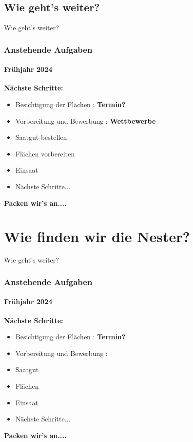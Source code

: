 \documentclass[aspectratio=169]{beamer}
\begin{document}
\subsection[Aufgaben]{Wie geht's weiter?}

\begin{frame}{Wie geht's weiter?}
	\frametitle{Anstehende Aufgaben} 
	\framesubtitle{Frühjahr 2024}

	\textbf{Nächste Schritte:}\\
	\begin{itemize}
		\item 
			Besichtigung der Flächen : 
			\textbf{Termin?} \pause 
		\item 
			Vorbereitung und Bewerbung : 
			\textbf{Wettbewerbe} \pause 
		\item 
			Saatgut bestellen \pause
		\item 
			Flächen vorbereiten \pause
		\item 
			Einsaat \pause
		\item 
			Nächste Schritte...%
	\end{itemize}
	\begin{center}
	\textbf{Packen wir's an....}	
	\end{center}
\end{frame}


\section[Aufgaben]{Wie finden wir die Nester?}

\begin{frame}{Wie geht's weiter?}
	\frametitle{Anstehende Aufgaben} 
	\framesubtitle{Frühjahr 2024}
	
	\textbf{Nächste Schritte:}\\
	\begin{itemize}
		\item 
		Besichtigung der Flächen : 
		\textbf{Termin?} \pause 
		\item 
		Vorbereitung und Bewerbung : 
		\textbf{} \pause 
		\item 
		Saatgut  \pause
		\item 
		Flächen  \pause
		\item 
		Einsaat \pause
		\item 
		Nächste Schritte...%
	\end{itemize}
	\begin{center}
		\textbf{Packen wir's an....}	
	\end{center}
\end{frame}

\end{document}
